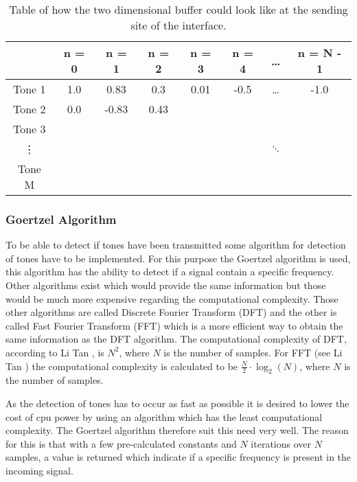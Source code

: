 		\begin{table}[htb]
			\begin{center}
				\begin{tabular}{c|c c c c c c c}
				 & n = 0 & n = 1 & n = 2 & n = 3 & n = 4 & \ldots & n = N - 1 \\
				\hline
				Tone 1 & 1.0 & 0.83 & 0.3 & 0.01 & -0.5 & \ldots & -1.0 \\
				Tone 2 & 0.0 & -0.83 & 0.43 & & & & \\
				Tone 3 &  &  &  &  &  &  & \\
				\vdots &  &  &  &  &  & $\ddots$ & \\
				Tone M &  &  &  &  &  &  & \\
				\end{tabular}
			\end{center}
			\caption{Table of how the two dimensional buffer could look like at the sending site of the interface.}
			\label{tab:2d_buffer}
		\end{table}
		
		\subsubsection{Goertzel Algorithm}
		To be able to detect if tones have been transmitted some algorithm for detection of tones have to be implemented.
		For this purpose the Goertzel algorithm is used, this algorithm has the ability to detect if a signal contain a
		specific frequency. Other algorithms exist which would provide the same information but those would be
		much more expensive regarding the computational complexity. Those other algorithms are called Discrete Fourier Transform (DFT)
		and the other is called Fast Fourier Transform (FFT) which is a more efficient way to obtain the same information
		as the DFT algorithm. The computational complexity of DFT, according to Li Tan \cite[124]{DSP}, is $N^2$, where $N$ is the number of samples.
		For FFT (see Li Tan \cite[124]{DSP}) the computational complexity is calculated to be $\frac{N}{2}\cdot \log_{2}(N)$,
		where $N$ is the number of samples.
		
		As the detection of tones has to occur as fast as possible it is desired to lower the cost of cpu power by using 
		an algorithm which has the least computational complexity. The Goertzel algorithm therefore suit this need very well.
		The reason for this is that with a few pre-calculated constants and $N$ iterations over $N$ samples, a value is returned
		which indicate if a specific frequency is present in the incoming signal.
		
